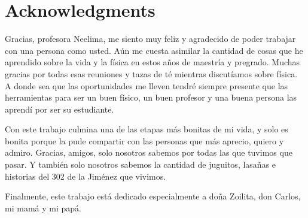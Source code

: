 
\chapter*{Acknowledgments}

Gracias, profesora Neelima, me siento muy feliz y agradecido de poder trabajar con una persona como usted.
Aún me cuesta asimilar la cantidad de cosas que he aprendido sobre la vida y la física en estos años de maestría y pregrado.
Muchas gracias por todas esas reuniones y tazas de té mientras discutíamos sobre física.
A donde sea que las oportunidades me lleven tendré siempre presente que las herramientas para ser un buen físico, un buen profesor y una buena persona las aprendí por ser su estudiante.

Con este trabajo culmina una de las etapas más bonitas de mi vida, y solo es bonita porque la pude compartir con las personas que más aprecio, quiero y admiro.
Gracias, amigos, solo nosotros sabemos por todas las que tuvimos que pasar.
Y también solo nosotros sabemos la cantidad de juguitos, lasañas e historias del 302 de la Jiménez que vivimos.

Finalmente, este trabajo está dedicado especialmente a doña Zoilita, don Carlos, mi mamá y mi papá. 